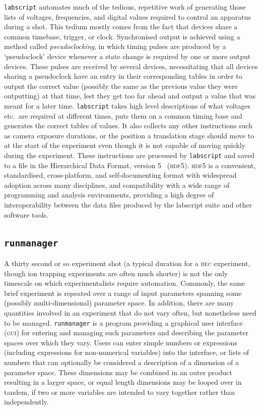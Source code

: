 \texttt{labscript} automates much of the tedious, repetitive work of generating those lists of voltages, frequencies, and digital values required to control an apparatus during a shot. This tedium mostly comes from the fact that devices share a common timebase, trigger, or clock. Synchronised output is achieved using a method called \emph{pseudoclocking}, in which timing pulses are produced by a `pseudoclock' device whenever a state change is required by one or more output devices. These pulses are received by several devices, necessitating that all devices sharing a pseudoclock have an entry in their corresponding tables in order to output the correct value (possibly the same as the previous value they were outputting) at that time, lest they get too far ahead and output a value that was meant for a later time. \texttt{labscript} takes high level descriptions of what voltages etc.~are required at different times, puts them on a common timing base and generates the correct tables of values. It also collects any other instructions such as camera exposure durations, or the position a translation stage should move to at the start of the experiment even though it is not capable of moving quickly during the experiment. These instructions are processed by \texttt{labscript} and saved to a file in the Hierarchical Data Format, version 5~\cite{the_hdf_group_hierarchical_1997} (\textsc{hdf5}). \textsc{hdf5} is a convenient, standardised, cross-platform, and self-documenting format with widespread adoption across many disciplines, and compatibility with a wide range of programming and analysis environments, providing a high degree of interoperability between the data files produced by the labscript suite and other software tools.

\subsection{\texttt{runmanager}}

A thirty second or so experiment shot (a typical duration for a \textsc{bec} experiment, though ion trapping experiments are often much shorter) is not the only timescale on which experimentalists require automation. Commonly, the same brief experiment is repeated over a range of input parameters spanning some (possibly multi-dimensional) parameter space. In addition, there are many quantities involved in an experiment that do not vary often, but nonetheless need to be managed. \texttt{runmanager} is a program providing a graphical user interface (\textsc{gui}) for entering and managing such parameters and describing the parameter spaces over which they vary. Users can enter simple numbers or expressions (including expressions for non-numerical variables) into the interface, or lists of numbers that can optionally be considered a description of a dimension of a parameter space. These dimensions may be combined in an outer product resulting in a larger space, or equal length dimensions may be looped over in tandem, if two or more variables are intended to vary together rather than independently.

